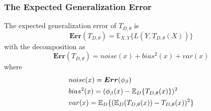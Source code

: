 \begin{frame}
    \frametitle{The Expected Generalization Error}
        The expected generalization error of $T_{D,\theta}$ is
        \begin{equation}\label{eq:exp_gen_error}
            \boldsymbol{Err}(T_{D,\theta}) = \mathbb{E}_{X,Y}\{L(Y, T_{D,\theta}(X)) \}
        \end{equation}
        with the decomposition as
        \begin{equation}
        \boldsymbol{Err}(T_{D,\theta}) = noise(x) + bias^2(x) + var(x)
    \end{equation}
    \qquad \quad where
    \begin{align}
        & noise(x) = \boldsymbol{Err}(\phi_{\beta}) \notag \\
        & bias^2(x) = (\phi_{\beta}(x) - \mathbb{E}_{D}\{T_{D,\theta}(x)\})^2 \notag \\
        & var(x) = \mathbb{E}_{D}\{(\mathbb{E}_{D}(T_{D,\theta}(x)) - T_{D,\theta}(x))^2\} \notag
    \end{align}
\end{frame}
